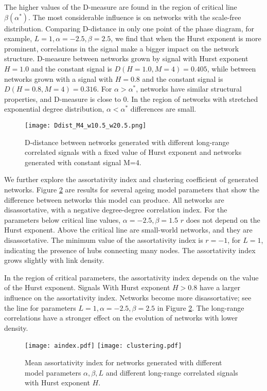 The higher values of the D-measure are found in the region of critical line $\beta(\alpha^{*})$. The most considerable influence is on networks with the scale-free distribution. Comparing D-distance in only one point of the phase diagram, for example, $L=1, \alpha = -2.5, \beta = 2.5$, we find that when the Hurst exponent is more prominent, correlations in the signal make a bigger impact on the network structure. D-measure between networks grown by signal with Hurst exponent $H=1.0$ and the constant signal is $D(H=1.0, M=4) = 0.405$, while between networks grown with a signal with $H=0.8$ and the constant signal is $D(H=0.8, M=4) = 0.316$. For $\alpha>\alpha^{*}$, networks have similar structural properties, and D-measure is close to 0. In the region of networks with stretched exponential degree distribution, $\alpha<\alpha^{*}$  differences are small. 

\begin{figure}[H]
	\centering
	\texttt{[image: Ddist\_M4\_w10.5\_w20.5.png]}
	\caption[D-distance for networks generated with monofractal signals. ]{D-distance between networks generated with different long-range correlated signals with a fixed value of Hurst exponent and networks generated with constant signal M=4.}
	\label{fig:Ddist_m}
\end{figure}


We further explore the assortativity index and clustering coefficient of generated networks. Figure \ref{fig:aindex} are results for several ageing model parameters that show the difference between networks this model can produce. All networks are disassortative, with a negative degree-degree correlation index. For the parameters below critical line values, $\alpha=-2.5, \beta=1.5$ $r$ does not depend on the Hurst exponent. Above the critical line are small-world networks, and they are disassortative. The minimum value of the assortativity index is $r =-1$, for $L=1$, indicating the presence of hubs connecting many nodes. The assortativity index grows slightly with link density. 

In the region of critical parameters, the assortativity index depends on the value of the Hurst exponent. Signals With Hurst exponent $H>0.8$ have a larger influence on the assortativity index. Networks become more disassortative; see the line for parameters $L=1, \alpha=-2.5, \beta=2.5$ in Figure \ref{fig:aindex}. The long-range correlations have a stronger effect on the evolution of networks with lower density. 

\begin{figure}[h!]
	\centering
	\texttt{[image: aindex.pdf]}
	\texttt{[image: clustering.pdf]}
	\caption[Assortativity index and mean clustering coefficient.]{Mean assortativity index for networks generated  with different model parameters $\alpha, \beta, L$ and different long-range correlated signals with Hurst exponent $H$.}
	\label{fig:aindex}
\end{figure} 


